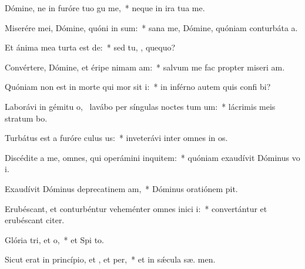 \item Dómine, ne in furóre tuo gu me,~* neque in ira tua  me.
\item Miserére mei, Dómine, quóni in sum:~* sana me, Dómine, quóniam conturbáta   a.
\item Et ánima mea turta est de:~* sed tu, , quequo?
\item Convértere, Dómine, et éripe nimam am:~* salvum me fac propter miseri am.
\item Quóniam non est in morte qui mor sit i:~* in inférno autem quis confi bi?
\item Laborávi in gémitu o,~\pscross{} lavábo per síngulas noctes tum um:~* lácrimis meis stratum  bo.
\item Turbátus est a furóre culus us:~* inveterávi inter omnes in os.
\item Discédite a me, omnes, qui operámini inquitem:~* quóniam exaudívit Dóminus vo  i.
\item Exaudívit Dóminus deprecatinem am,~* Dóminus oratiónem  pit.
\item Erubéscant, et conturbéntur veheménter omnes inici i:~* convertántur et erubéscant  citer.
\item Glória tri, et o,~* et Spi to.
\item Sicut erat in princípio, et , et per,~* et in sǽcula sæ. men.
